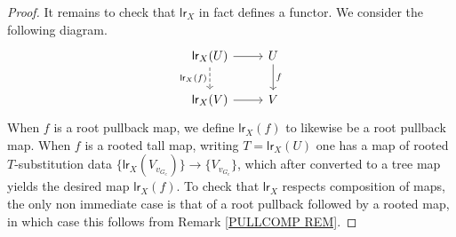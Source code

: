 \documentclass[a4paper,10pt]{article}%
\begin{document}
\begin{proof}
  It remains to check that $\mathsf{lr}_X$ in fact defines a functor. We consider the following diagram.
  \[
  \begin{tikzcd}
    \mathsf{lr}_X(U) \ar{r} \ar[dashed]{d}[swap]{\mathsf{lr}_X(f)} & U \ar{d}{f}
    \\
    \mathsf{lr}_X(V) \ar{r} & V
  \end{tikzcd}
  \]
  When $f$ is a root pullback map, we define $\mathsf{lr}_X(f)$ to likewise be a root pullback map. When $f$ is a rooted tall map, writing $T=\mathsf{lr}_X(U)$ one has a map of rooted $T$-substitution data
  $\{\mathsf{lr}_X(V_{v_{G_e}})\} \to \{V_{v_{G_e}}\}$,
  which after converted to a tree map yields the desired map 
  $\mathsf{lr}_X(f)$.
  To check that $\mathsf{lr}_X$ respects composition of maps, 
  the only non immediate case is that of a root pullback followed by a rooted map, in which case this follows from Remark \ref{PULLCOMP REM}.
\end{proof}
\end{document}
